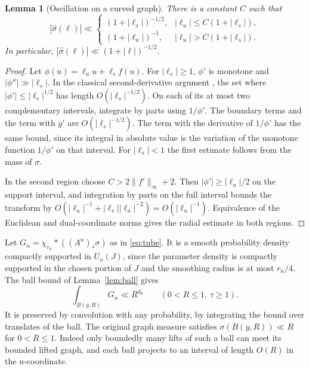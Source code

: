 \documentclass[11pt,a4paper,reqno]{amsart}
\newtheorem{lemma}[theorem]{Lemma}
\theoremstyle{definition}
\theoremstyle{remark}
\numberwithin{equation}{section}
\begin{document}
\begin{lemma}[Oscillation on a curved graph]\label{lem:curve-oscillation}
There is a constant \(C\) such that
\begin{equation}\label{eq:curve-oscillation}
|\widehat\sigma(\ell)|\ll
\begin{cases}
 (1+|\ell_s|)^{-1/2},&|\ell_u|\le C(1+|\ell_s|),\\
 (1+|\ell_u|)^{-1},&|\ell_u|> C(1+|\ell_s|).
\end{cases}
\end{equation}
In particular, \(|\widehat\sigma(\ell)|\ll(1+|\ell|)^{-1/2}\).
\end{lemma}
\begin{proof}
Let \(\phi(u)=\ell_u u+\ell_s f(u)\). For \(|\ell_s|\ge1\),
\(\phi'\) is monotone and \(|\phi''|\gg|\ell_s|\). In the classical
second-derivative argument \cite{VdC,Stein}, the set where
\(|\phi'|\le|\ell_s|^{1/2}\) has length \(O(|\ell_s|^{-1/2})\).
On each of its at most two complementary intervals, integrate by parts
using \(1/\phi'\). The boundary terms and the term with \(g'\) are
\(O(|\ell_s|^{-1/2})\). The term with the derivative of \(1/\phi'\)
has the same bound, since its integral in absolute value is the
variation of the monotone function \(1/\phi'\) on that interval.
For \(|\ell_s|<1\) the first estimate follows from the mass of \(\sigma\).

In the second region choose \(C>2\|f'\|_\infty+2\). Then
\(|\phi'|\ge|\ell_u|/2\) on the support interval, and integration by
parts on the full interval bounds the transform by
\(O(|\ell_u|^{-1}+|\ell_s||\ell_u|^{-2})=O(|\ell_u|^{-1})\).
Equivalence of the Euclidean and dual-coordinate norms gives the radial
estimate in both regions.
\end{proof}

Let \(G_n=\chi_{r_n}*((A^n)_*\sigma)\) as in \eqref{eq:tube}.
It is a smooth probability density compactly supported in \(U_n(J)\),
since the parameter density is compactly supported in the chosen portion
of \(J\) and the smoothing radius is at most \(r_n/4\). The ball bound
of Lemma~\ref{lem:ball} gives
\begin{equation}\label{eq:curve-balls}
   \int_{B(y,R)}G_n\ll R^{d_0}\qquad(0<R\le1,\ \tau\ge1).
\end{equation}
It is preserved by convolution with any probability, by integrating
the bound over translates of the ball. The original graph measure
satisfies \(\sigma(B(y,R))\ll R\) for \(0<R\le1\). Indeed only boundedly
many lifts of such a ball can meet its bounded lifted graph, and each
ball projects to an interval of length \(O(R)\) in the \(u\)-coordinate.
\end{document}
